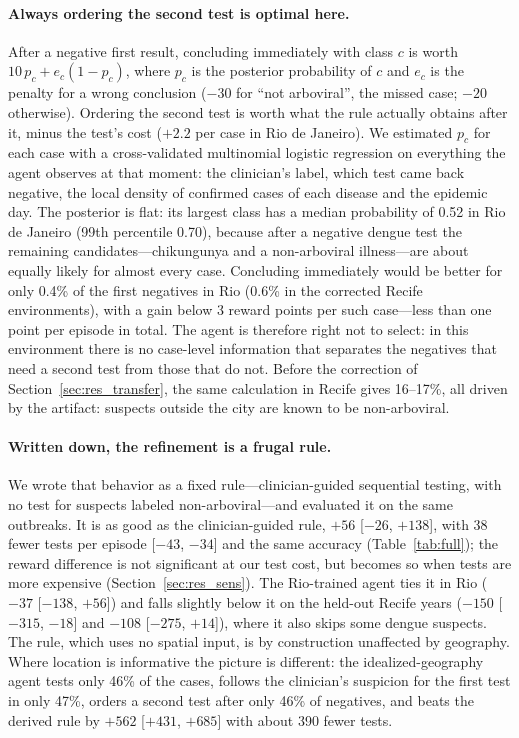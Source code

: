 \documentclass[11pt,a4paper]{article}
\begin{document}
\paragraph{Always ordering the second test is optimal here.} After a negative first result, concluding immediately with class $c$ is worth $10\,p_c + e_c(1 - p_c)$, where $p_c$ is the posterior probability of $c$ and $e_c$ is the penalty for a wrong conclusion ($-30$ for ``not arboviral'', the missed case; $-20$ otherwise). Ordering the second test is worth what the rule actually obtains after it, minus the test's cost ($+2.2$ per case in Rio de Janeiro). We estimated $p_c$ for each case with a cross-validated multinomial logistic regression on everything the agent observes at that moment: the clinician's label, which test came back negative, the local density of confirmed cases of each disease and the epidemic day. The posterior is flat: its largest class has a median probability of 0.52 in Rio de Janeiro (99th percentile 0.70), because after a negative dengue test the remaining candidates---chikungunya and a non-arboviral illness---are about equally likely for almost every case. Concluding immediately would be better for only 0.4\% of the first negatives in Rio (0.6\% in the corrected Recife environments), with a gain below 3 reward points per such case---less than one point per episode in total. The agent is therefore right not to select: in this environment there is no case-level information that separates the negatives that need a second test from those that do not. Before the correction of Section~\ref{sec:res_transfer}, the same calculation in Recife gives 16--17\%, all driven by the artifact: suspects outside the city are known to be non-arboviral.

\paragraph{Written down, the refinement is a frugal rule.} We wrote that behavior as a fixed rule---clinician-guided sequential testing, with no test for suspects labeled non-arboviral---and evaluated it on the same outbreaks. It is as good as the clinician-guided rule, $+56$ [$-26$, $+138$], with 38 fewer tests per episode [$-43$, $-34$] and the same accuracy (Table~\ref{tab:full}); the reward difference is not significant at our test cost, but becomes so when tests are more expensive (Section~\ref{sec:res_sens}). The Rio-trained agent ties it in Rio ($-37$ [$-138$, $+56$]) and falls slightly below it on the held-out Recife years ($-150$ [$-315$, $-18$] and $-108$ [$-275$, $+14$]), where it also skips some dengue suspects. The rule, which uses no spatial input, is by construction unaffected by geography. Where location is informative the picture is different: the idealized-geography agent tests only 46\% of the cases, follows the clinician's suspicion for the first test in only 47\%, orders a second test after only 46\% of negatives, and beats the derived rule by $+562$ [$+431$, $+685$] with about 390 fewer tests.
\end{document}
